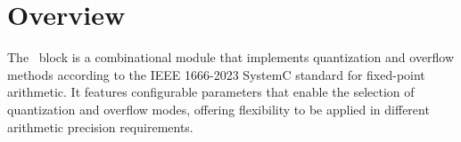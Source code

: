
\section{Overview}


The \blockname\ block is a combinational module that implements quantization and overflow methods according to the IEEE 1666-2023 SystemC standard \cite{SystemC} for fixed-point arithmetic. It features configurable parameters that enable the selection of quantization and overflow modes, offering flexibility to be applied in different arithmetic precision requirements.
